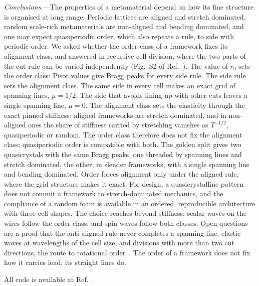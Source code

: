 \documentclass[aps,prl,twocolumn,superscriptaddress,amsmath,amssymb,floatfix]{revtex4-2}
\begin{document}
\textit{Conclusions.}---The properties of a metamaterial depend on how its fine structure is
organised at long range. Periodic lattices are aligned and stretch dominated, random
scale-rich metamaterials are non-aligned and bending dominated, and one may expect quasiperiodic
order, which also repeats a rule, to side with periodic order. We asked whether the order class
of a framework fixes its alignment class, and answered in recursive cell division, where the
two parts of the cut rule can be varied independently (Fig.~S2 of Ref.~\cite{supp}). The value
of $r_0$ sets the order class: Pisot values give Bragg peaks for every side rule. The side rule
sets the alignment class. The same side in every cell makes an exact grid of spanning lines,
$\mu=1/2$. The side that avoids lining up with other cuts leaves a single spanning line,
$\mu=0$. The alignment class sets the elasticity through the exact pinned stiffness: aligned
frameworks are stretch dominated, and in non-aligned ones the share of stiffness carried by
stretching vanishes as $T^{-1/2}$, quasiperiodic or random. The order class therefore does not
fix the alignment class: quasiperiodic order is compatible with both. The golden split gives two quasicrystals with the
same Bragg peaks, one threaded by spanning lines and stretch dominated, the other, in slender
frameworks, with a single spanning line and bending dominated. Order forces alignment only under the aligned rule, where the grid
structure makes it exact. For design, a quasicrystalline pattern does not commit a framework
to stretch-dominated mechanics, and the compliance of a random foam is available in an ordered,
reproducible architecture with three cell shapes. The choice reaches beyond stiffness: scalar waves on the wires
follow the order class, and spin waves follow both classes. Open questions are a proof that the
anti-aligned rule never completes a spanning line, elastic waves at wavelengths of the cell
size,
and divisions with more than two cut directions, the route to rotational
order~\cite{radin1994}. The order of a framework does not fix how it carries load; its straight
lines do.

\begin{acknowledgments}
All code is available at Ref.~\cite{code}.
\end{acknowledgments}


\end{document}
